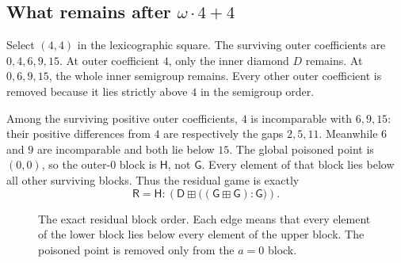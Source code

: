 \documentclass[11pt,letterpaper]{article}
\numberwithin{equation}{section}
\theoremstyle{definition}
\newcommand{\ps}{\mathbin{\boxplus}}
\renewcommand{\Game}{\mathsf G}
\newcommand{\Poison}{\mathsf H}
\newcommand{\DiamondGame}{\mathsf D}
\newcommand{\RGame}{\mathsf R}
\begin{document}
\subsection{What remains after \texorpdfstring{$\omega\cdot4+4$}{omega*4+4}}

Select $(4,4)$ in the lexicographic square. The surviving outer coefficients
are $0,4,6,9,15$. At outer coefficient $4$, only the inner diamond $D$
remains. At $0,6,9,15$, the whole inner semigroup remains. Every other
outer coefficient is removed because it lies strictly above $4$ in the
semigroup order.

Among the surviving positive outer coefficients, $4$ is incomparable with
$6,9,15$: their positive differences from $4$ are respectively the gaps
$2,5,11$. Meanwhile $6$ and $9$ are incomparable and both lie below $15$.
The global poisoned point is $(0,0)$, so the outer-$0$ block is $\Poison$,
not $\Game$. Every element of that block lies below all other surviving
blocks. Thus the residual game is exactly
\begin{equation}\label{eq:residual}
 \RGame=\Poison:
 \left(\DiamondGame\ps\bigl((\Game\ps\Game):\Game\bigr)\right).
\end{equation}

\begin{figure}[htbp]
\centering
{}
\caption{The exact residual block order. Each edge means that every element
of the lower block lies below every element of the upper block. The
poisoned point is removed only from the $a=0$ block.}
\label{fig:blocks}
\end{figure}
\end{document}
